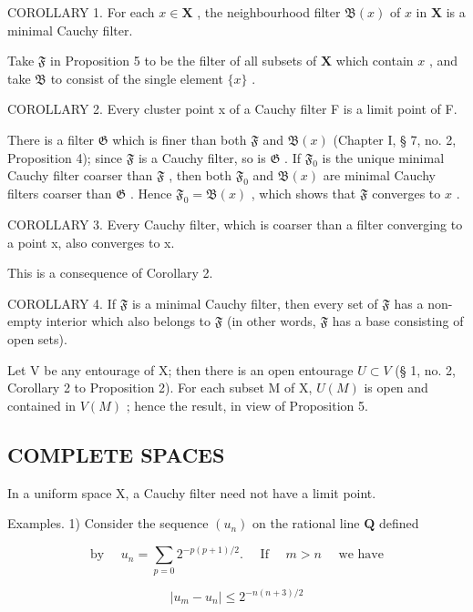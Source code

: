 COROLLARY 1. For each \(x \in \mathbf{X}\) , the neighbourhood filter \(\mathfrak{B}(x)\) of \(x\) in \(\mathbf{X}\) is a minimal Cauchy filter.

Take \(\mathfrak{F}\) in Proposition 5 to be the filter of all subsets of \(\mathbf{X}\) which contain \(x\) , and take \(\mathfrak{B}\) to consist of the single element \(\{x\}\) .

COROLLARY 2. Every cluster point x of a Cauchy filter F is a limit point of F.

There is a filter \(\mathfrak{G}\) which is finer than both \(\mathfrak{F}\) and \(\mathfrak{B}(x)\) (Chapter I, § 7, no. 2, Proposition 4); since \(\mathfrak{F}\) is a Cauchy filter, so is \(\mathfrak{G}\) . If \(\mathfrak{F}_0\) is the unique minimal Cauchy filter coarser than \(\mathfrak{F}\) , then both \(\mathfrak{F}_0\) and \(\mathfrak{B}(x)\) are minimal Cauchy filters coarser than \(\mathfrak{G}\) . Hence \(\mathfrak{F}_0 = \mathfrak{B}(x)\) , which shows that \(\mathfrak{F}\) converges to \(x\) .

COROLLARY 3. Every Cauchy filter, which is coarser than a filter converging to a point x, also converges to x.

This is a consequence of Corollary 2.

COROLLARY 4. If \(\mathfrak{F}\) is a minimal Cauchy filter, then every set of \(\mathfrak{F}\) has a non-empty interior which also belongs to \(\mathfrak{F}\) (in other words, \(\mathfrak{F}\) has a base consisting of open sets).

Let V be any entourage of X; then there is an open entourage \(U \subset V\) (§ 1, no. 2, Corollary 2 to Proposition 2). For each subset M of X, \(U(M)\) is open and contained in \(V(M)\) ; hence the result, in view of Proposition 5.

\subsection{COMPLETE SPACES}

In a uniform space X, a Cauchy filter need not have a limit point.

Examples. 1) Consider the sequence \((u_{n})\) on the rational line \(\mathbf{Q}\) defined

\[
\text { by } \quad u _ {n} = \sum_ {p = 0} 2 ^ {- p (p + 1) / 2}. \quad \text { If } \quad m > n \quad \text { we   have }\tag{1}
\]

\[
\left| u _ {m} - u _ {n} \right| \leqslant 2 ^ {- n (n + 3) / 2}
\]

